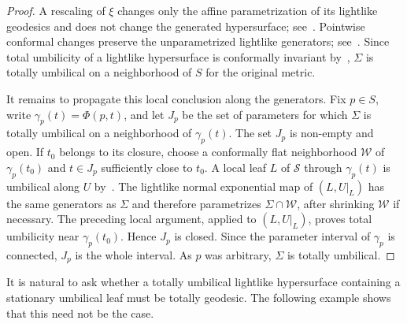 \documentclass[11pt]{article}
\numberwithin{equation}{section}
\begin{document}
\begin{proof}
	A rescaling of $\xi$ changes only the affine parametrization of its lightlike geodesics and does not change the generated hypersurface; see~. Pointwise conformal changes preserve the unparametrized lightlike generators; see~. Since total umbilicity of a lightlike hypersurface is conformally invariant by~, $\Sigma$ is totally umbilical on a neighborhood of $S$ for the original metric.

	It remains to propagate this local conclusion along the generators. Fix $p\in S$, write $\gamma_p(t)=\Phi(p,t)$, and let $J_p$ be the set of parameters for which $\Sigma$ is totally umbilical on a neighborhood of $\gamma_p(t)$. The set $J_p$ is non-empty and open. If $t_0$ belongs to its closure, choose a conformally flat neighborhood $\mathscr W$ of $\gamma_p(t_0)$ and $t\in J_p$ sufficiently close to $t_0$. A local leaf $L$ of $\mathcal S$ through $\gamma_p(t)$ is umbilical along $U$ by~. The lightlike normal exponential map of $(L,U|_L)$ has the same generators as $\Sigma$ and therefore parametrizes $\Sigma\cap\mathscr W$, after shrinking $\mathscr W$ if necessary. The preceding local argument, applied to $(L,U|_L)$, proves total umbilicity near $\gamma_p(t_0)$. Hence $J_p$ is closed. Since the parameter interval of $\gamma_p$ is connected, $J_p$ is the whole interval. As $p$ was arbitrary, $\Sigma$ is totally umbilical.
	\end{proof}
	
	
	
It is natural to ask whether a totally umbilical lightlike hypersurface containing a stationary umbilical leaf must be totally geodesic. The following example shows that this need not be the case.
\end{document}
